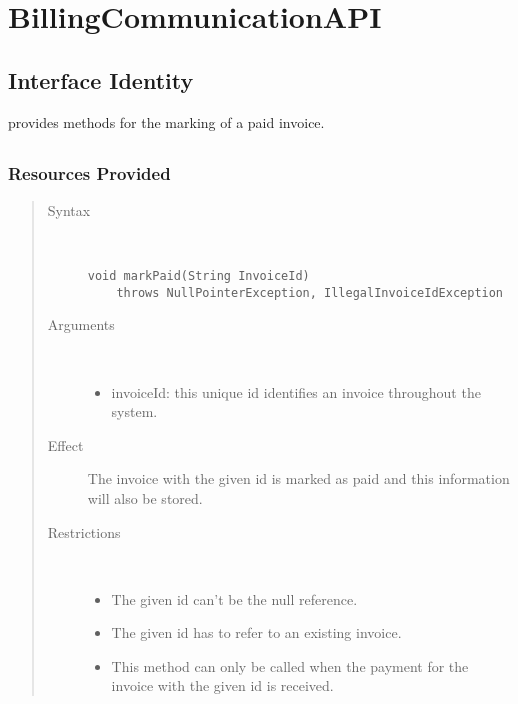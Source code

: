 \section{BillingCommunicationAPI}
\label{api:other-billing-communication-api}

\subsection{Interface Identity}

\npar {} provides methods for the marking of a
paid invoice.

\subsection{}

\subsubsection{Resources Provided}

\begin{quote}
	\begin{description}
		\item[Syntax] \
		\begin{verbatim}
void markPaid(String InvoiceId)
    throws NullPointerException, IllegalInvoiceIdException
		\end{verbatim}
		\item[Arguments] \
		\begin{itemize}
		  \item invoiceId: this unique id identifies an invoice throughout the system.
		\end{itemize}
		\item[Effect] The invoice with the given id is marked as paid and this
		information will also be stored. 
		\item[Restrictions] \
		\begin{itemize}
		  \item The given id can't be the null reference.
		  \item The given id has to refer to an existing invoice.
		  \item This method can only be called when the payment for the invoice with
		  the given id is received.
		\end{itemize}
	\end{description} 
\end{quote}

